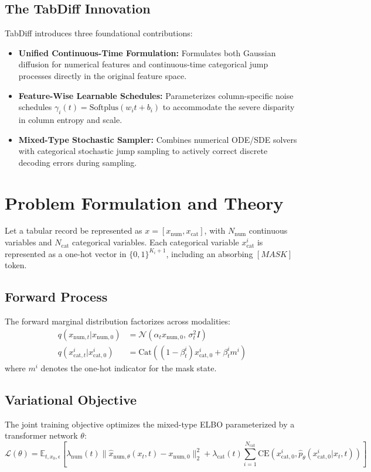 \documentclass[11pt,a4paper]{article}
\begin{document}
\subsection{The TabDiff Innovation}
TabDiff introduces three foundational contributions:
\begin{itemize}
    \item \textbf{Unified Continuous-Time Formulation:} Formulates both Gaussian diffusion for numerical features and continuous-time categorical jump processes directly in the original feature space.
    \item \textbf{Feature-Wise Learnable Schedules:} Parameterizes column-specific noise schedules $\gamma_i(t) = \text{Softplus}(w_i t + b_i)$ to accommodate the severe disparity in column entropy and scale.
    \item \textbf{Mixed-Type Stochastic Sampler:} Combines numerical ODE/SDE solvers with categorical stochastic jump sampling to actively correct discrete decoding errors during sampling.
\end{itemize}

\section{Problem Formulation and Theory}
Let a tabular record be represented as $x = [x_{\text{num}}, x_{\text{cat}}]$, with $N_{\text{num}}$ continuous variables and $N_{\text{cat}}$ categorical variables. Each categorical variable $x_{\text{cat}}^i$ is represented as a one-hot vector in $\{0, 1\}^{K_i+1}$, including an absorbing $[MASK]$ token.

\subsection{Forward Process}
The forward marginal distribution factorizes across modalities:
\begin{align}
    q(x_{\text{num}, t} | x_{\text{num}, 0}) &= \mathcal{N}\left(\alpha_t x_{\text{num}, 0},\, \sigma_t^2 I\right) \\
    q(x_{\text{cat}, t}^i | x_{\text{cat}, 0}^i) &= \text{Cat}\left((1 - \beta_t^i) x_{\text{cat}, 0}^i + \beta_t^i m^i\right)
\end{align}
where $m^i$ denotes the one-hot indicator for the mask state.

\subsection{Variational Objective}
The joint training objective optimizes the mixed-type ELBO parameterized by a transformer network $\theta$:
\begin{equation}
    \mathcal{L}(\theta) = \mathbb{E}_{t, x_0, \epsilon} \left[ \lambda_{\text{num}}(t) \|\hat{x}_{\text{num}, \theta}(x_t, t) - x_{\text{num}, 0}\|_2^2 + \lambda_{\text{cat}}(t) \sum_{i=1}^{N_{\text{cat}}} \text{CE}\left(x_{\text{cat}, 0}^i, \hat{p}_\theta(x_{\text{cat}, 0}^i | x_t, t)\right) \right]
\end{equation}
\end{document}
